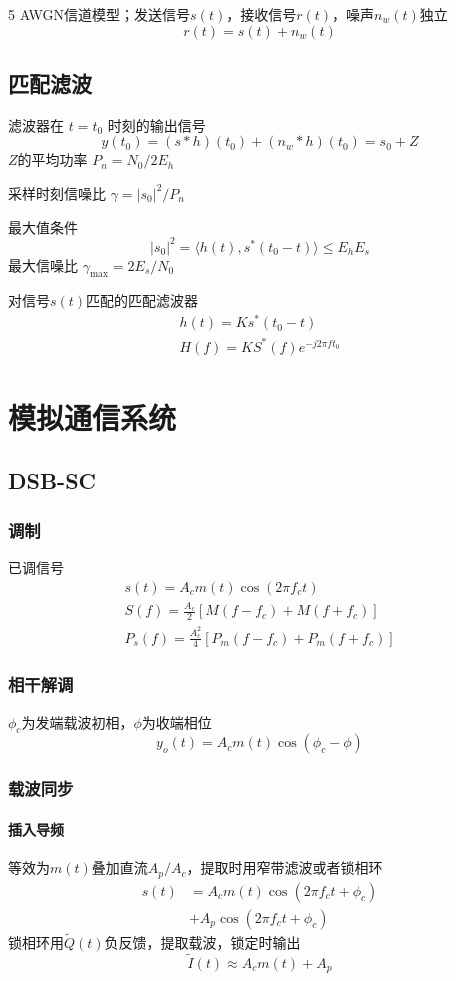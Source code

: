 \documentclass[8pt, a4paper]{extarticle}
\begin{document}
\begin{multicols}{5}
AWGN信道模型；发送信号\(s(t)\)，接收信号\(r(t)\)，噪声\(n_w(t)\)独立
\[
r(t)=s(t)+n_w(t)
\]
\subsection{匹配滤波}
滤波器在 \( t = t_0 \) 时刻的输出信号
\[
y(t_0) = (s\ast h)(t_0) + (n_w\ast h)(t_0) = s_0 + Z
\]
\(Z\)的平均功率
\(
P_n=N_0/2 E_h
\)

采样时刻信噪比
\(
\gamma = |s_0|^2/P_n
\)

最大值条件
\[
|s_0|^2 = \langle h(t),s^*(t_0-t) \rangle \leq E_h E_s
\]
最大信噪比
\(
\gamma_{\max} = 2E_s/N_0
\)

对信号\(s(t)\)匹配的匹配滤波器
\[
\begin{gathered}
h(t)=Ks^*(t_0-t)\\
H(f)=KS^*(f)e^{-j2\pi ft_0}
\end{gathered}
\]

\section{模拟通信系统}
\subsection{DSB-SC}
\subsubsection{调制}
已调信号
\begin{gather*}
s(t)=A_c m(t)\cos(2\pi f_c t)\\
S(f)=\frac{A_c}{2}[M(f-f_c)+M(f+f_c)]\\
P_s(f)=\frac{A_c^2}{4}[P_m(f-f_c)+P_m(f+f_c)]
\end{gather*}
\subsubsection{相干解调}
\(\phi_c\)为发端载波初相，\(\phi\)为收端相位
\[
y_o(t)=A_c m(t)\cos(\phi_c -\phi)
\]
\subsubsection{载波同步}
\paragraph{插入导频}
等效为\(m(t)\)叠加直流\(A_p/A_c\)，提取时用窄带滤波或者锁相环
\begin{align*}
s(t)&=A_c m(t)\cos(2\pi f_c t+\phi_c) \\
&+ A_p\cos(2\pi f_c t+\phi_c)
\end{align*}
锁相环用\(\tilde{Q}(t)\)负反馈，提取载波，锁定时输出
\[
\tilde{I}(t)\approx A_c m(t)+A_p
\]

\end{multicols}
\end{document}
